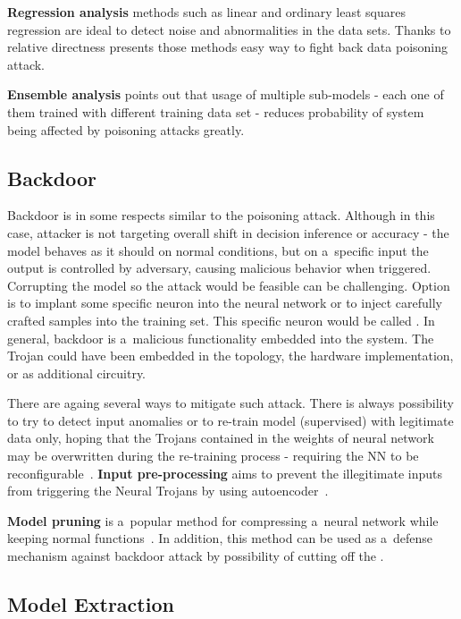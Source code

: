 \textbf{Regression analysis} methods such as linear and ordinary least squares regression are ideal to detect noise and abnormalities in the data sets.
Thanks to relative directness presents those methods easy way to fight back data poisoning attack.

\textbf{Ensemble analysis} points out that usage of multiple sub-models - each one of them trained with different training data set - reduces probability of system being affected by poisoning attacks greatly.

\subsection{Backdoor}\label{subsec:backdoor}

Backdoor is in some respects similar to the poisoning attack.
Although in this case, attacker is not targeting overall shift in decision inference or accuracy - the model behaves as it should on normal conditions, but on a~specific input the output is controlled by adversary, causing malicious behavior when triggered.
Corrupting the model so the attack would be feasible can be challenging.
Option is to implant some specific neuron into the neural network or to inject carefully crafted samples into the training set.
This specific neuron would be called .
In general, backdoor is a~malicious functionality embedded into the system.
The Trojan could have been embedded in the topology, the hardware implementation, or as additional circuitry.

There are againg several ways to mitigate such attack.
There is always possibility to try to detect input anomalies or to re-train model (supervised) with legitimate data only, hoping that the Trojans contained in the weights of neural network may be overwritten during the re-training process - requiring the NN to be reconfigurable~\cite{arxiv:neural_trojans}.
\textbf{Input pre-processing} aims to prevent the illegitimate inputs from triggering the Neural Trojans by using autoencoder~\cite{arxiv:neural_trojans}.

\textbf{Model pruning} is a~popular method for compressing a~neural network while keeping normal functions~\cite{arxiv:pruning_nn,arxiv:fine_pruning_nn}.
In addition, this method can be used as a~defense mechanism against backdoor attack by possibility of cutting off the .

\subsection{Model Extraction}\label{subsec:model-extraction}

